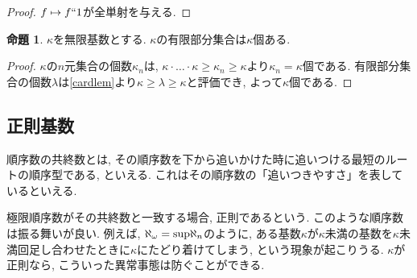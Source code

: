 \documentclass[a4paper, twoside]{bxjsarticle}
\theoremstyle{definition}
\newtheorem{prop}[thm]{命題}
\begin{document}
        \begin{proof}
            $f\mapsto f``1$が全単射を与える.
        \end{proof}
        \begin{prop}
            $\kappa$を無限基数とする. $\kappa$の有限部分集合は$\kappa$個ある.
        \end{prop}
        \begin{proof}
            $\kappa$の$n$元集合の個数$\kappa_n$は, $\kappa\cdot\dots\cdot\kappa\geq\kappa_n\geq\kappa$より$\kappa_n=\kappa$個である. 有限部分集合の個数$\lambda$は\ref{cardlem}より$\kappa\geq\lambda\geq\kappa$と評価でき, よって$\kappa$個である.
        \end{proof}
        
    \subsection{正則基数}
        順序数の共終数とは, その順序数を下から追いかけた時に追いつける最短のルートの順序型である, といえる. これはその順序数の「追いつきやすさ」を表しているといえる. 
        
        極限順序数がその共終数と一致する場合, 正則であるという. このような順序数は振る舞いが良い. 例えば, $\aleph_\omega = {\rm sup}\aleph_n$のように, ある基数$\kappa$が$\kappa$未満の基数を$\kappa$未満回足し合わせたときに$\kappa$にたどり着けてしまう, という現象が起こりうる. $\kappa$が正則なら, こういった異常事態は防ぐことができる.
        
\end{document}
